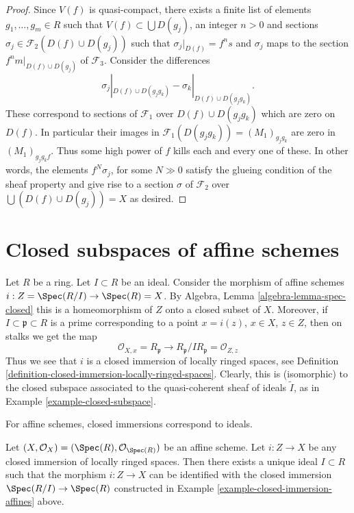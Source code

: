 \begin{proof}
\medskip\noindent
Since $V(f)$ is quasi-compact, there exists a finite list
of elements $g_1, \ldots, g_m \in R$ such that
$V(f) \subset \bigcup D(g_j)$, an integer $n > 0$ and sections
$\sigma_j \in \mathcal{F}_2(D(f) \cup D(g_j))$ such that
$\sigma_j|_{D(f)} = f^n s$ and $\sigma_j$ maps to the section
$f^nm|_{D(f) \cup D(g_j)}$ of $\mathcal{F}_3$.
Consider the differences
$$
\sigma_j|_{D(f) \cup D(g_jg_k)}
-
\sigma_k|_{D(f) \cup D(g_jg_k)}.
$$
These correspond to sections of $\mathcal{F}_1$
over $D(f) \cup D(g_jg_k)$ which are zero
on $D(f)$. In particular their images in
$\mathcal{F}_1(D(g_jg_k)) = (M_1)_{g_jg_k}$
are zero in $(M_1)_{g_jg_kf}$.
Thus some high power of $f$ kills each and every one of these.
In other words, the elements $f^N \sigma_j$, for some $N \gg 0$
satisfy the glueing condition of the sheaf property and
give rise to a section $\sigma $ of $\mathcal{F}_2$
over $\bigcup (D(f) \cup D(g_j)) = X$ as desired.
\end{proof}







\section{Closed subspaces of affine schemes}
\label{section-closed-in-affine}

\begin{example}
\label{example-closed-immersion-affines}
Let $R$ be a ring.
Let $I \subset R$ be an ideal.
Consider the morphism of affine schemes
$i : Z = \Spec(R/I) \to \Spec(R) = X$.
By Algebra, Lemma \ref{algebra-lemma-spec-closed}
this is a homeomorphism of $Z$ onto a closed
subset of $X$. Moreover, if $I \subset \mathfrak p \subset R$
is a prime corresponding to a point $x = i(z)$, $x \in X$,
$z \in Z$, then on stalks we get the map
$$
\mathcal{O}_{X, x} = R_{\mathfrak p}
\longrightarrow
R_{\mathfrak p}/IR_{\mathfrak p} = \mathcal{O}_{Z, z}
$$
Thus we see that $i$ is a closed immersion of locally ringed spaces,
see Definition \ref{definition-closed-immersion-locally-ringed-spaces}.
Clearly, this is (isomorphic) to the closed subspace associated
to the quasi-coherent sheaf of ideals $\widetilde I$, as in
Example \ref{example-closed-subspace}.
\end{example}

\begin{lemma}
\label{lemma-closed-immersion-affine-case}
\begin{slogan}
For affine schemes, closed immersions correspond to ideals.
\end{slogan}
Let $(X, \mathcal{O}_X) = (\Spec(R), \mathcal{O}_{\Spec(R)})$
be an affine scheme. Let $i : Z \to X$ be any closed immersion
of locally ringed spaces. Then there exists a unique ideal
$I \subset R$ such that the morphism $i : Z \to X$ can be identified
with the closed immersion $\Spec(R/I) \to \Spec(R)$
constructed in Example \ref{example-closed-immersion-affines} above.
\end{lemma}


